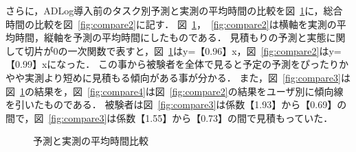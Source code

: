 さらに，ADLog導入前のタスク別予測と実測の平均時間の比較を図~\ref{fig:compare}に，総合時間の比較を図~\ref{fig:compare2}に記す．
図~\ref{fig:compare}，~\ref{fig:compare2}は横軸を実測の平均時間，縦軸を予測の平均時間にしたものである．
見積もりの予測と実態に関して切片が0の一次関数で表すと，図~\ref{fig:compare}はy=【0.96】x，図~\ref{fig:compare2}はy=【0.99】xになった．
この事から被験者を全体で見ると予定の予測をぴったりかやや実測より短めに見積もる傾向がある事が分かる．
また，図~\ref{fig:compare3}は図~\ref{fig:compare}の結果を，図~\ref{fig:compare4}は図~\ref{fig:compare2}の結果をユーザ別に傾向線を引いたものである．
被験者は図~\ref{fig:compare3}は係数【1.93】から【0.69】の間で，図~\ref{fig:compare3}は係数【1.55】から【0.73】の間で見積もっていた．

\begin{figure}[hb]
	\begin{center}
		\caption{予測と実測の平均時間比較}
		\label{fig:compare}
	\end{center}
\end{figure}

